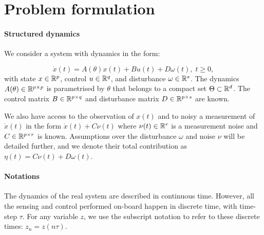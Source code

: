 \documentclass{article}
\begin{document}
\section{Problem formulation}

\paragraph{Structured dynamics}
We consider a system with dynamics in the form:

\begin{equation}
\label{eq:dynamics}
\dot{x}(t)=A(\theta)x(t) + B u(t) + D \omega(t),\;t\geq0,
\end{equation}
with state $x\in\mathbb{R}^p$, control $u\in\mathbb{R}^q$, and disturbance $\omega\in\mathbb{R}^s$. The dynamics $A(\theta)\in\mathbb{R}^{p\times p}$  is parametrised by $\theta$ that belongs to a compact set $\Theta \subset \mathbb{R}^d$. The control matrix $B\in\mathbb{R}^{p\times q}$ and disturbance matrix $D\in\mathbb{R}^{p\times s}$ are known.

We also have access to the observation of $x(t)$ and to noisy a measurement of $\dot{x}(t)$ in the form
$
    \dot{x}(t) + C\nu(t)
$ where $\nu(t)\in\mathbb{R}^r$ is a measurement noise and $C\in\mathbb{R}^{p\times r}$ is known. Assumptions over the disturbance $\omega$ and noise $\nu$ will be detailed further, and we denote their total contribution as $\eta(t) = C\nu(t) + D\omega(t)$.

\paragraph{Notations}

The dynamics of the real system are described in continuous time. However, all the sensing and control performed on-board happen in discrete time, with time-step $\tau$. For any variable $z$, we use the subscript notation to refer to these discrete times: $z_n = z(n\tau)$.




\end{document}
